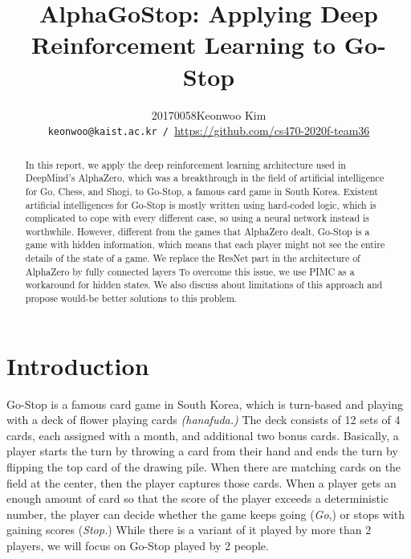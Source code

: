 \documentclass[10pt,twocolumn,letterpaper]{article}
\begin{document}
\title{AlphaGoStop: Applying Deep Reinforcement Learning
to Go-Stop}

\author{20170058\quad Keonwoo Kim\\\normalsize\texttt{keonwoo@kaist.ac.kr / }\url{https://github.com/cs470-2020f-team36}}

\maketitle


\begin{abstract}
   In this report, we apply the deep reinforcement learning architecture used in DeepMind's AlphaZero, which was a breakthrough in the field of artificial intelligence for Go, Chess, and Shogi, to Go-Stop, a famous card game in South Korea. Existent artificial intelligences for Go-Stop is mostly written using hard-coded logic, which is complicated to cope with every different case, so using a neural network instead is worthwhile. However, different from the games that AlphaZero dealt, Go-Stop is a game with hidden information, which means that each player might not see the entire details of the state of a game. We replace the ResNet part in the architecture of AlphaZero by fully connected layers To overcome this issue, we use PIMC as a workaround for hidden states. We also discuss about limitations of this approach and propose would-be better solutions to this problem.
\end{abstract}


\section{Introduction}
Go-Stop is a famous card game in South Korea, which is turn-based and playing with a deck of flower playing cards \textit{(hanafuda.)} The deck consists of 12 sets of 4 cards, each assigned with a month, and additional two bonus cards. Basically, a player starts the turn by throwing a card from their hand and ends the turn by flipping the top card of the drawing pile. When there are matching cards on the field at the center, then the player captures those cards. When a player gets an enough amount of card so that the score of the player exceeds a deterministic number, the player can decide whether the game keeps going (\textit{Go},) or stops with gaining scores (\textit{Stop.}) While there is a variant of it played by more than 2 players, we will focus on Go-Stop played by 2 people.
\end{document}
